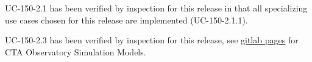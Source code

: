 
UC-150-2.1 has been verified by inspection for this release in that
all specializing use cases chosen for this release are implemented (UC-150-2.1.1).


UC-150-2.3 has been verified by inspection for this release, see \href{http://simulation-models-761d18.gitlab-pages.cta-observatory.org/}{gitlab pages} for CTA Observatory Simulation Models.
